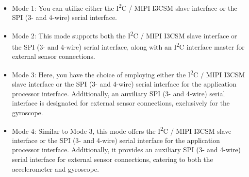 \begin{itemize}
    \item Mode 1: You can utilize either the I\textsuperscript{2}C / MIPI I3CSM slave interface or the SPI (3- and 4-wire) serial interface.
    
    \item Mode 2: This mode supports both the I\textsuperscript{2}C / MIPI I3CSM slave interface or the SPI (3- and 4-wire) serial interface, along with an I\textsuperscript{2}C interface master for external sensor connections.
    
    \item Mode 3: Here, you have the choice of employing either the I\textsuperscript{2}C / MIPI I3CSM slave interface or the SPI (3- and 4-wire) serial interface for the application processor interface. Additionally, an auxiliary SPI (3- and 4-wire) serial interface is designated for external sensor connections, exclusively for the gyroscope.
    
    \item Mode 4: Similar to Mode 3, this mode offers the I\textsuperscript{2}C / MIPI I3CSM slave interface or the SPI (3- and 4-wire) serial interface for the application processor interface. Additionally, it provides an auxiliary SPI (3- and 4-wire) serial interface for external sensor connections, catering to both the accelerometer and gyroscope.	
    
\end{itemize}

